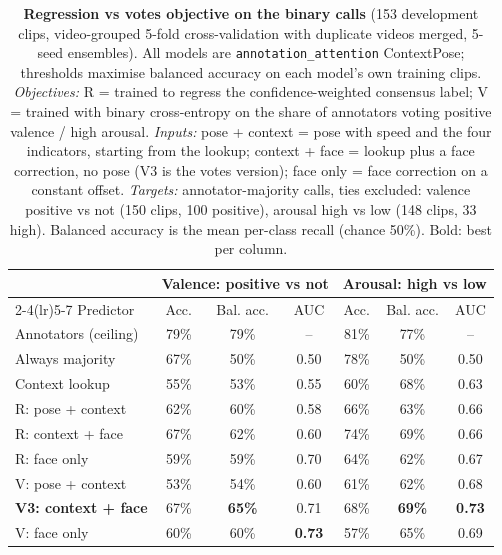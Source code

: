 \documentclass[11pt]{article}
\newcommand{\code}[1]{\texttt{#1}}
\newcommand{\best}[1]{\textbf{#1}}
\begin{document}
\begin{table}[!htbp]
\centering
\caption{\textbf{Regression vs votes objective on the binary calls} (153 development clips, video-grouped 5-fold cross-validation with duplicate videos merged, 5-seed ensembles). All models are \code{annotation\_attention} ContextPose; thresholds maximise balanced accuracy on each model's own training clips.
\emph{Objectives:} R = trained to regress the confidence-weighted consensus label; V = trained with binary cross-entropy on the share of annotators voting positive valence / high arousal.
\emph{Inputs:} pose + context = pose with speed and the four indicators, starting from the lookup; context + face = lookup plus a face correction, no pose (V3 is the votes version); face only = face correction on a constant offset.
\emph{Targets:} annotator-majority calls, ties excluded: valence positive vs not (150 clips, 100 positive), arousal high vs low (148 clips, 33 high). Balanced accuracy is the mean per-class recall (chance 50\%). Bold: best per column.}
\label{tab:v3}
\small
\begin{tabular}{lcccccc}
\toprule
 & \multicolumn{3}{c}{Valence: positive vs not} & \multicolumn{3}{c}{Arousal: high vs low} \\
\cmidrule(lr){2-4}\cmidrule(lr){5-7}
Predictor & Acc. & Bal. acc. & AUC & Acc. & Bal. acc. & AUC \\
\midrule
Annotators (ceiling) & 79\% & 79\% & -- & 81\% & 77\% & -- \\
Always majority & 67\% & 50\% & 0.50 & 78\% & 50\% & 0.50 \\
Context lookup & 55\% & 53\% & 0.55 & 60\% & 68\% & 0.63 \\
R: pose + context & 62\% & 60\% & 0.58 & 66\% & 63\% & 0.66 \\
R: context + face & 67\% & 62\% & 0.60 & 74\% & 69\% & 0.66 \\
R: face only & 59\% & 59\% & 0.70 & 64\% & 62\% & 0.67 \\
V: pose + context & 53\% & 54\% & 0.60 & 61\% & 62\% & 0.68 \\
\best{V3: context + face} & 67\% & \best{65\%} & 0.71 & 68\% & \best{69\%} & \best{0.73} \\
V: face only & 60\% & 60\% & \best{0.73} & 57\% & 65\% & 0.69 \\
\bottomrule
\end{tabular}
\end{table}
\end{document}

